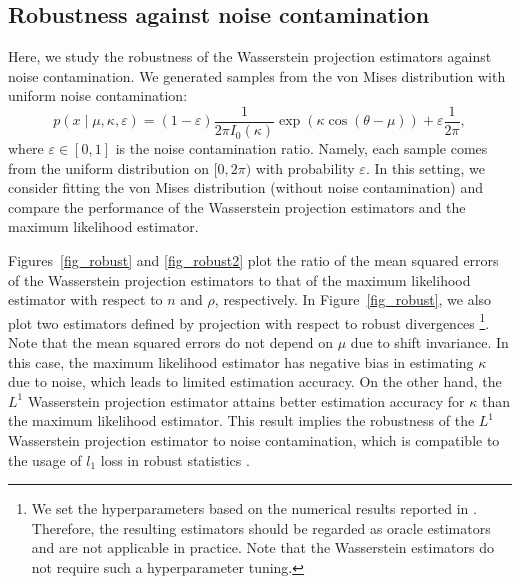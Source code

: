 \documentclass[11pt, a4paper]{article}
\begin{document}
\subsection{Robustness against noise contamination}\label{sec_contam}
Here, we study the robustness of the Wasserstein projection estimators against noise contamination.
We generated samples from the von Mises distribution with uniform noise contamination: 
\[
p(x \mid \mu,\kappa,\varepsilon) = (1-\varepsilon) \frac{1}{2 \pi I_0(\kappa)}\exp (\kappa \cos (\theta-\mu)) + \varepsilon \frac{1}{2 \pi},
\]
where $\varepsilon \in [0,1]$ is the noise contamination ratio.
Namely, each sample comes from the uniform distribution on $[0,2\pi)$ with probability $\varepsilon$.
In this setting, we consider fitting the von Mises distribution (without noise contamination) and compare the performance of the Wasserstein projection estimators and the maximum likelihood estimator.

Figures~\ref{fig_robust} and \ref{fig_robust2} plot the ratio of the mean squared errors of the Wasserstein projection estimators to that of the maximum likelihood estimator with respect to $n$ and $\rho$, respectively.
In Figure~\ref{fig_robust}, we also plot two estimators defined by projection with respect to robust divergences \cite{Kato} \footnote{We set the hyperparameters based on the numerical results reported in \cite{Kato}. Therefore, the resulting estimators should be regarded as oracle estimators and are not applicable in practice. Note that the Wasserstein estimators do not require such a hyperparameter tuning.}.
Note that the mean squared errors do not depend on $\mu$ due to shift invariance.
In this case, the maximum likelihood estimator has negative bias in estimating $\kappa$ due to noise, which leads to limited estimation accuracy.
On the other hand, the $L^1$ Wasserstein projection estimator attains better estimation accuracy for $\kappa$ than the maximum likelihood estimator.
This result implies the robustness of the $L^1$ Wasserstein projection estimator to noise contamination, which is compatible to the usage of $l_1$ loss in robust statistics \cite{Huber}.
\end{document}
